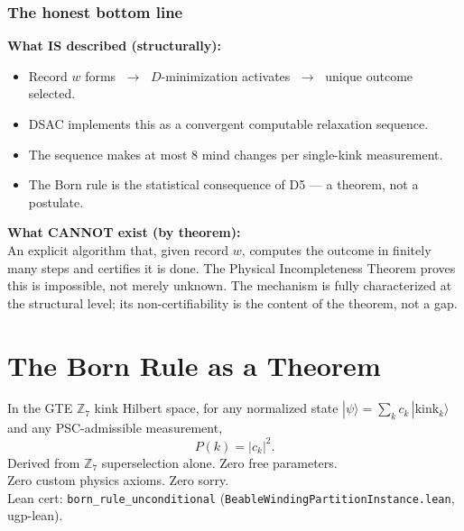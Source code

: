 \documentclass[11pt,a4paper]{article}
\newcommand{\lean}[1]{\texttt{#1}}
\newcommand{\CatAL}{\textbf{CatAL}}
\begin{document}
\subsubsection*{The honest bottom line}

\begin{tcolorbox}[colback=boxgreen,colframe=green!50!black,
  title=What GTE establishes about the mechanism]
\textbf{What IS described (structurally):}
\begin{itemize}
  \item Record $w$ forms $\;\to\;$ $D$-minimization activates $\;\to\;$ unique outcome selected.
  \item DSAC implements this as a convergent computable relaxation sequence.
  \item The sequence makes at most 8 mind changes per single-kink measurement.
  \item The Born rule is the statistical consequence of D5 --- a theorem, not a postulate.
\end{itemize}
\textbf{What CANNOT exist (by theorem):}\\
An explicit algorithm that, given record $w$, computes the outcome in finitely many
steps and certifies it is done.  The Physical Incompleteness Theorem proves this is
impossible, not merely unknown.  The mechanism is fully characterized at the
structural level; its non-certifiability is the content of the theorem, not a gap.
\end{tcolorbox}

\section{The Born Rule as a Theorem}

\begin{tcolorbox}[colback=boxgreen,colframe=green!50!black,
  title={Result: The Born Rule Is a Theorem (\CatAL)}]
  In the GTE $\mathbb{Z}_7$ kink Hilbert space, for any normalized state
  $|\psi\rangle = \sum_k c_k\,|\text{kink}_k\rangle$ and any PSC-admissible
  measurement,
  \[
    P(k) = |c_k|^2.
  \]
  Derived from $\mathbb{Z}_7$ superselection alone.  Zero free parameters.\\
  Zero custom physics axioms.  Zero sorry.\\[4pt]
  Lean cert: \lean{born\_rule\_unconditional}
  (\texttt{BeableWindingPartitionInstance.lean}, ugp-lean).
\end{tcolorbox}
\end{document}
